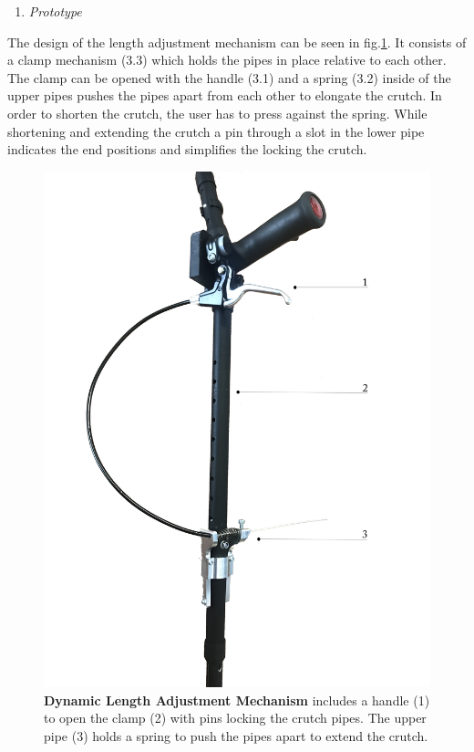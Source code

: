 \documentclass[conference,a4paper]{IEEEtran}
\begin{document}
\begin{enumerate}[\textit{1)}]
    \item{\textit{Prototype}}
\end{enumerate}
The design of the length adjustment mechanism can be seen in fig.\ref{fig:LAM}. It consists of a clamp mechanism (3.3) which holds the pipes in place relative to each other. The clamp can be opened with the handle (3.1) and a spring (3.2) inside of the upper pipes pushes the pipes apart from each other to elongate the crutch. In order to shorten the crutch, the user has to press against the spring. While shortening and extending the crutch a pin through a slot in the lower pipe indicates the end positions and simplifies the locking the crutch.
\begin{figure}
    \centering
    \includegraphics[width=1\columnwidth]{Images/Results/LAM.png}
    \caption{\textbf{Dynamic Length Adjustment Mechanism} includes a handle (1) to open the clamp (2) with pins locking the crutch pipes. The upper pipe (3) holds a spring to push the pipes apart to extend the crutch.}
    \label{fig:LAM}
\end{figure}
\end{document}
